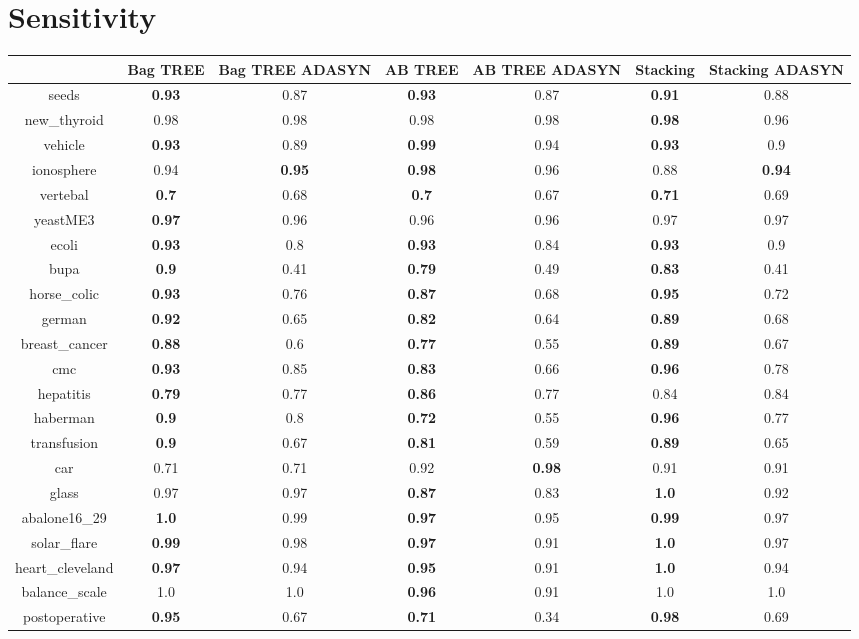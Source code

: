 \documentclass{article}%
\begin{document}
%
\section*{Sensitivity}%
\begin{tabular}{c|cccccc}%
&Bag TREE&Bag TREE ADASYN&AB TREE&AB TREE ADASYN&Stacking&Stacking ADASYN\\%
\hline%
seeds&\textbf{0.93}&0.87&\textbf{0.93}&0.87&\textbf{0.91}&0.88\\%
new\_thyroid&0.98&0.98&0.98&0.98&\textbf{0.98}&0.96\\%
vehicle&\textbf{0.93}&0.89&\textbf{0.99}&0.94&\textbf{0.93}&0.9\\%
ionosphere&0.94&\textbf{0.95}&\textbf{0.98}&0.96&0.88&\textbf{0.94}\\%
vertebal&\textbf{0.7}&0.68&\textbf{0.7}&0.67&\textbf{0.71}&0.69\\%
yeastME3&\textbf{0.97}&0.96&0.96&0.96&0.97&0.97\\%
ecoli&\textbf{0.93}&0.8&\textbf{0.93}&0.84&\textbf{0.93}&0.9\\%
bupa&\textbf{0.9}&0.41&\textbf{0.79}&0.49&\textbf{0.83}&0.41\\%
horse\_colic&\textbf{0.93}&0.76&\textbf{0.87}&0.68&\textbf{0.95}&0.72\\%
german&\textbf{0.92}&0.65&\textbf{0.82}&0.64&\textbf{0.89}&0.68\\%
breast\_cancer&\textbf{0.88}&0.6&\textbf{0.77}&0.55&\textbf{0.89}&0.67\\%
cmc&\textbf{0.93}&0.85&\textbf{0.83}&0.66&\textbf{0.96}&0.78\\%
hepatitis&\textbf{0.79}&0.77&\textbf{0.86}&0.77&0.84&0.84\\%
haberman&\textbf{0.9}&0.8&\textbf{0.72}&0.55&\textbf{0.96}&0.77\\%
transfusion&\textbf{0.9}&0.67&\textbf{0.81}&0.59&\textbf{0.89}&0.65\\%
car&0.71&0.71&0.92&\textbf{0.98}&0.91&0.91\\%
glass&0.97&0.97&\textbf{0.87}&0.83&\textbf{1.0}&0.92\\%
abalone16\_29&\textbf{1.0}&0.99&\textbf{0.97}&0.95&\textbf{0.99}&0.97\\%
solar\_flare&\textbf{0.99}&0.98&\textbf{0.97}&0.91&\textbf{1.0}&0.97\\%
heart\_cleveland&\textbf{0.97}&0.94&\textbf{0.95}&0.91&\textbf{1.0}&0.94\\%
balance\_scale&1.0&1.0&\textbf{0.96}&0.91&1.0&1.0\\%
postoperative&\textbf{0.95}&0.67&\textbf{0.71}&0.34&\textbf{0.98}&0.69\\%
\end{tabular}
\end{document}
